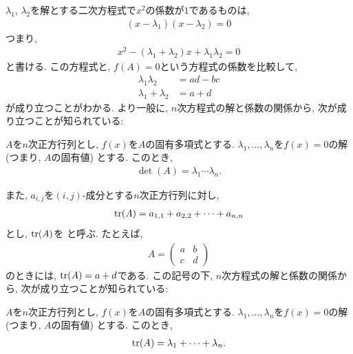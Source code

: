   
  $\lambda_1$, $\lambda_2$を解とする二次方程式で$x^2$の係数が$1$であるものは,
  \begin{align*}
    (x-\lambda_1)(x-\lambda_2)=0
  \end{align*}
  つまり,
  \begin{align*}
    x^2-(\lambda_1+\lambda_2)x+\lambda_1\lambda_2=0
  \end{align*}
  と書ける.
  この方程式と, $f(A)=0$という方程式の係数を比較して,
  \begin{align*}
    \lambda_1\lambda_2 &= ad-bc\\
    \lambda_1+\lambda_2 &= a+d
  \end{align*}
  が成り立つことがわかる.
  より一般に,
  $n$次方程式の解と係数の関係から,
  次が成り立つことが知られている:
  \begin{theorem}
    \label{thm:det:eigen}
    $A$を$n$次正方行列とし,
    $f(x)$を$A$の固有多項式とする.
    $\lambda_1,\ldots,\lambda_n$を$f(x)=0$の解
    (つまり,
    $A$の固有値)
    とする.
    このとき,
    \begin{align*}
      \det(A)=\lambda_1\cdots\lambda_n.
    \end{align*}
  \end{theorem}
  また, $a_{i,j}$を$(i,j)$-成分とする$n$次正方行列に対し,
  \begin{align*}
    \operatorname{tr}(A)=a_{1,1}+a_{2,2}+\cdots+a_{n,n}
  \end{align*}
  とし,
  $\operatorname{tr}(A)$を
  と呼ぶ.
  たとえば,
  \begin{align*}
    A=\begin{pmatrix}a&b\\c&d\end{pmatrix}
  \end{align*}
  のときには,
  $\operatorname{tr}(A)=a+d$である.
  この記号の下,
  $n$次方程式の解と係数の関係から,
  次が成り立つことが知られている:
  \begin{theorem}
    $A$を$n$次正方行列とし,
    $f(x)$を$A$の固有多項式とする.
    $\lambda_1,\ldots,\lambda_n$を$f(x)=0$の解
    (つまり,
    $A$の固有値)
    とする.
    このとき,
    \begin{align*}
      \operatorname{tr}(A)=\lambda_1+\cdots+\lambda_n.
    \end{align*}
  \end{theorem}

